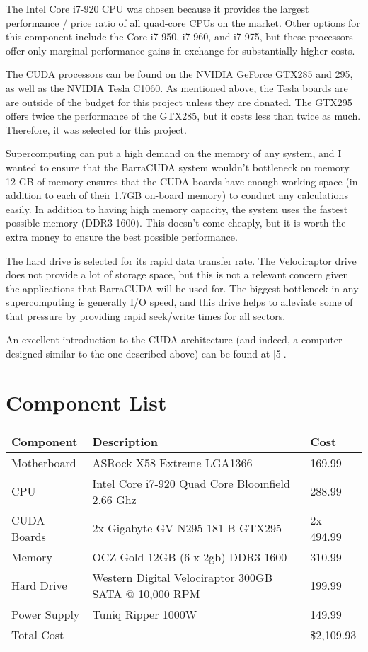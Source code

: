\documentclass{article}      %
\begin{document}
The Intel Core i7-920 CPU was chosen because it provides the largest performance / price ratio of all quad-core CPUs on the market. Other options for this component include the Core i7-950, i7-960, and i7-975, but these  processors offer only marginal performance gains in exchange for substantially higher costs.

The CUDA processors can be found on the NVIDIA GeForce GTX285 and 295, as well as the NVIDIA Tesla C1060. As mentioned above, the Tesla boards are are outside of the budget for this project unless they are donated. The GTX295 offers twice the performance of the GTX285, but it costs less than twice as much. Therefore, it was selected for this project.

Supercomputing can put a high demand on the memory of any system, and I wanted to ensure that the BarraCUDA system wouldn't bottleneck on memory. 12 GB of memory ensures that the CUDA boards have enough working space (in addition to each of their 1.7GB on-board memory) to conduct any calculations easily. In addition to having high memory capacity, the system uses the fastest possible memory (DDR3 1600). This doesn't come cheaply, but it is worth the extra money to ensure the best possible performance.

The hard drive is selected for its rapid data transfer rate. The Velociraptor drive does not provide a lot of storage space, but this is not a relevant concern given the applications that BarraCUDA will be used for. The biggest bottleneck in any supercomputing is generally I/O speed, and this drive helps to alleviate some of that pressure by providing rapid seek/write times for all sectors.

An excellent introduction to the CUDA architecture (and indeed, a computer designed similar to the one described above) can be found at [5].


\section{Component List}
\begin{table}[h]
	\centering
		\begin{tabular}{|l|l|l|}
		\hline
			Component & Description & Cost\\ \hline
			Motherboard & ASRock X58 Extreme LGA1366 & 169.99\\ \hline
			CPU & Intel Core i7-920 Quad Core Bloomfield 2.66 Ghz & 288.99\\ \hline
			CUDA Boards & 2x Gigabyte GV-N295-181-B  GTX295 & 2x 494.99\\ \hline
			Memory & OCZ Gold 12GB (6 x 2gb) DDR3 1600 & 310.99\\ \hline
			Hard Drive & Western Digital Velociraptor 300GB SATA @ 10,000 RPM & 199.99\\ \hline
			Power Supply & Tuniq Ripper 1000W & 149.99\\ \hline
			Total Cost &  & \$2,109.93\\ 
		\hline
		\end{tabular}
\end{table}
\end{document}
